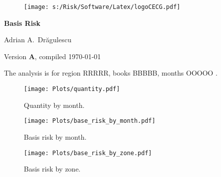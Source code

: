 \documentclass[letterpaper,10pt]{article}
\newcommand{\region}{RRRRR}
\newcommand{\book}{BBBBB}
\begin{document}
\begin{figure}
\texttt{[image: s:/Risk/Software/Latex/logoCECG.pdf]}
\hfill
{}
\end{figure}
 
\vspace*{0.5in}
\begin{center}
\LARGE\bf{Basis Risk}
\end{center}
\begin{center}
   Adrian A.\ Dr\u{a}gulescu
\end{center}
\begin{center}
  \small{Version {\bf A}, compiled \today}
\end{center}
\vspace*{1in}

The analysis is for region \region, books \book, months OOOOO .



\clearpage



\clearpage
\begin{figure}
\centerline{
 \texttt{[image: Plots/quantity.pdf]}} 
 \caption{Quantity by month.}
\end{figure}

\clearpage
\begin{figure}
\centerline{
 \texttt{[image: Plots/base\_risk\_by\_month.pdf]}} 
 \caption{Basis risk by month.}
\end{figure}
\begin{figure}
\centerline{
 \texttt{[image: Plots/base\_risk\_by\_zone.pdf]}} 
 \caption{Basis risk by zone.}
\end{figure}
\end{document}
